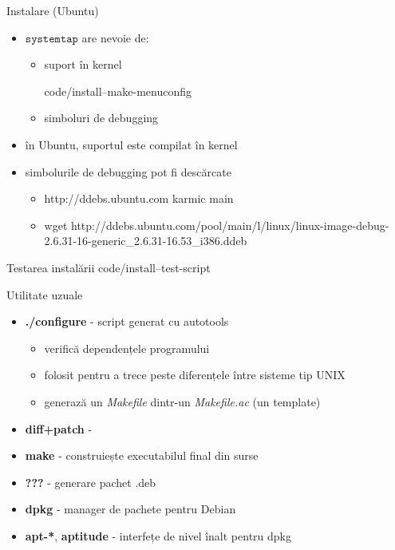 \documentclass{beamer}
\newcommand{\systemtap}{$\texttt{systemtap}$ }
\begin{document}
\begin{frame}{Instalare (Ubuntu)}
  \begin{itemize}
    \item \systemtap are nevoie de:
      \begin{itemize} 
      \item suport în kernel
        \begin{beamerboxesrounded}[lower=block body,shadow=true]
          \small  {code/install--make-menuconfig}
        \end{beamerboxesrounded}
      \item simboluri de debugging
      \end{itemize}
    \item în Ubuntu, suportul este compilat în kernel
    \item simbolurile de debugging pot fi descărcate
      \begin{itemize}
      \item http://ddebs.ubuntu.com karmic main
      \item wget http://ddebs.ubuntu.com/pool/main/l/linux/linux-image-debug-2.6.31-16-generic\_2.6.31-16.53\_i386.ddeb
      \end{itemize}
  \end{itemize}
\end{frame}


\begin{frame}{Testarea instalării}
   {code/install--test-script}
\end{frame}


\begin{frame}{Utilitate uzuale}
  \begin{itemize}[<+->]
  \item \textbf{./configure} - script generat cu autotools
    \begin{itemize}
    \item verifică dependențele programului
    \item folosit pentru a trece peste diferențele între sisteme tip UNIX
    \item generază un \textit{Makefile} dintr-un \textit{Makefile.ac} (un template)
    \end{itemize}
  \item \textbf{diff+patch} - 
  \item \textbf{make} - construiește executabilul final din surse
  \item \textbf{???} - generare pachet .deb
  \item \textbf{dpkg} - manager de pachete pentru Debian
  \item \textbf{apt-*}, \textbf{aptitude} - interfețe de nivel înalt pentru dpkg
  \end{itemize}
\end{frame}
\end{document}
